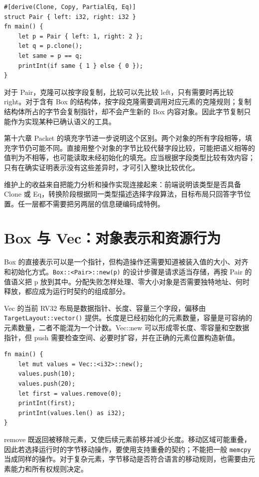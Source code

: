 \begin{lstlisting}[language=Rustless,caption={标量成员的结构体可以组合复制与相等能力}]
#[derive(Clone, Copy, PartialEq, Eq)]
struct Pair { left: i32, right: i32 }
fn main() {
    let p = Pair { left: 1, right: 2 };
    let q = p.clone();
    let same = p == q;
    printInt(if same { 1 } else { 0 });
}
\end{lstlisting}
对于 Pair，克隆可以按字段复制，比较可以先比较 left，只有需要时再比较 right。对于含有 Box 的结构体，按字段克隆需要调用对应元素的克隆规则；复制结构体所占的字节会复制指针，却不会产生新的 Box 内容对象。因此字节复制只能作为实现某种已确认语义的工具。

第十六章 Packet 的填充字节进一步说明这个区别。两个对象的所有字段相等，填充字节仍可能不同。直接用整个对象的字节比较代替字段比较，可能把语义相等的值判为不相等，也可能读取未经初始化的填充。应当根据字段类型比较有效内容；只有在确实证明表示没有这些差异时，才可引入整块比较优化。

维护上的收益来自把能力分析和操作实现连接起来：前端说明该类型是否具备 Clone 或 Eq，转换阶段根据同一类型描述选择字段算法，目标布局只回答字节位置。任一层都不需要把另两层的信息硬编码成特例。

\section{Box 与 Vec：对象表示和资源行为}
Box 的直接表示可以是一个指针，但构造操作还需要知道被装入值的大小、对齐和初始化方式。\texttt{Box::<Pair>::new(p)} 的设计步骤是请求适当存储，再按 Pair 的值语义把 p 放到其中。分配失败怎样处理、零大小对象是否需要独特地址、何时释放，都应成为运行时契约的组成部分。

Vec 的当前 RV32 布局是数据指针、长度、容量三个字段，偏移由 \texttt{TargetLayout::vector()} 提供。长度是已经初始化的元素数量，容量是可容纳的元素数量，二者不能混为一个计数。Vec::new 可以形成零长度、零容量和空数据指针，但 push 需要检查空间、必要时扩容，并在正确的元素位置构造新值。

\begin{lstlisting}[language=Rustless,caption={Vec 操作既访问描述符，也访问元素存储}]
fn main() {
    let mut values = Vec::<i32>::new();
    values.push(10);
    values.push(20);
    let first = values.remove(0);
    printInt(first);
    printInt(values.len() as i32);
}
\end{lstlisting}
remove 既返回被移除元素，又使后续元素前移并减少长度。移动区域可能重叠，因此若选择运行时的字节移动操作，要使用支持重叠的契约；不能把一般 \texttt{memcpy} 当成同样的操作。对于复杂元素，字节移动是否符合语言的移动规则，也需要由元素能力和所有权规则决定。

